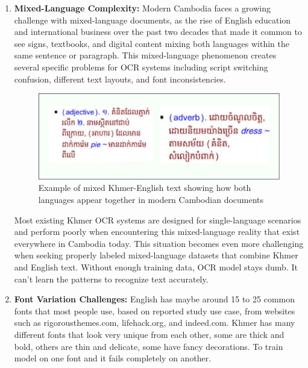 \begin{enumerate}
    \item \textbf{Mixed-Language Complexity:} Modern Cambodia faces a growing challenge with mixed-language documents, as the rise of English education and international business over the past two decades that made it common to see signs, textbooks, and digital content mixing both languages within the same sentence or paragraph. This mixed-language phenomenon creates several specific problems for OCR systems including script switching confusion, different text layouts, and font inconsistencies.
    
        \begin{figure}[H]
            \centering
            \includegraphics[width=\textwidth]{figures/mix_language_khmer_and_english.png}
            \caption{Example of mixed Khmer-English text showing how both languages appear together in modern Cambodian documents}
            \label{fig:mix_language}
        \end{figure}
        
        Most existing Khmer OCR systems are designed for single-language scenarios and perform poorly when encountering this mixed-language reality that exist everywhere in Cambodia today. This situation becomes even more challenging when seeking properly labeled mixed-language datasets that combine Khmer and English text. Without enough training data, OCR model stays dumb. It can't learn the patterns to recognize text accurately.

    \item \textbf{Font Variation Challenges:} English has maybe around 15 to 25 common fonts that most people use, based on reported study use case, from websites such as rigorousthemes.com, lifehack.org, and indeed.com. Khmer has many different fonts that look very unique from each other, some are thick and bold, others are thin and delicate, some have fancy decorations. To train model on one font and it fails completely on another.
    

\end{enumerate}
